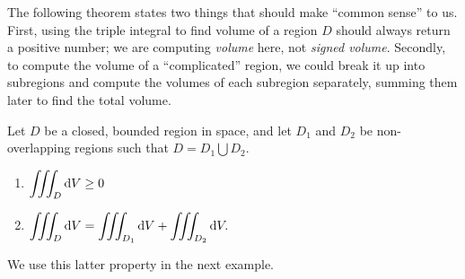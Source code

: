 The following theorem states two things that should make ``common sense'' to us. First, using the triple integral to find volume of a region $D$ should always return a positive number; we are computing \emph{volume} here, not \emph{signed volume}. Secondly, to compute the volume of a ``complicated'' region, we could break it up into subregions and compute the volumes of each subregion separately, summing them later to find the total volume.

\begin{theorem}\label{thm:triple_int_prop}%
Let $D$ be a closed, bounded region in space, and let $D_1$ and $D_2$ be non-overlapping regions such that $D=D_1\bigcup D_2$.
\begin{enumerate}
	\item $\displaystyle \iiint_D \operatorname{d}\! V \geq 0$
	\item	$\displaystyle \iiint_D\operatorname{d}\! V = \iiint_{D_1}\operatorname{d}\! V + \iiint_{D_2}\operatorname{d}\! V.$
\end{enumerate}
\end{theorem}

We use this latter property in the next example.

